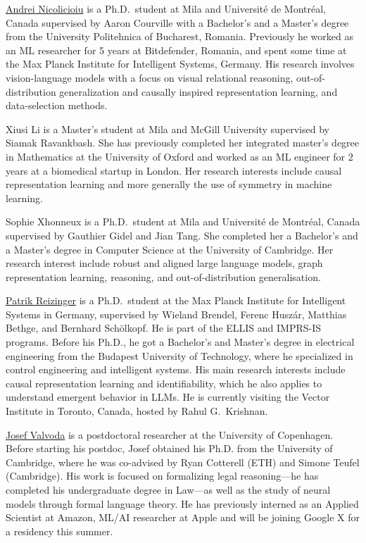 \documentclass{article}
\begin{document}
\href{https://andreinicolicioiu.github.io/}{Andrei Nicolicioiu} is a Ph.D.\ student at Mila and Universit\'{e} de Montr\'{e}al, Canada supervised by Aaron Courville with a Bachelor’s and a Master’s degree from the University Politehnica of Bucharest, Romania. Previously he worked as an ML researcher for 5 years at Bitdefender, Romania, and spent some time at the Max Planck Institute for Intelligent Systems, Germany. His research involves vision-language models with a focus on visual relational reasoning, out-of-distribution generalization and causally inspired representation learning, and data-selection methods.

Xiusi Li is a Master's student at Mila and McGill University supervised by Siamak Ravankbash. She has previously completed her integrated master's degree in Mathematics at the University of Oxford and worked as an ML engineer for 2 years at a biomedical startup in London. Her research interests include causal representation learning and more generally the use of symmetry in machine learning.

Sophie Xhonneux is a Ph.D.\ student at Mila and Universit\'{e} de Montr\'{e}al, Canada supervised by Gauthier Gidel and Jian Tang. She completed her a Bachelor's and a Master's degree in Computer Science at the University of Cambridge. Her research interest include robust and aligned large language models, graph representation learning, reasoning, and out-of-distribution generalisation.


\href{https://rpatrik96.github.io/}{Patrik Reizinger} is a Ph.D.\ student at the Max Planck Institute for Intelligent Systems in Germany, supervised by Wieland Brendel, Ferenc Huszár, Matthias Bethge, and Bernhard Schölkopf. He is part of the ELLIS and IMPRS-IS programs. Before his Ph.D., he got a Bachelor's and Master's degree in electrical engineering from the Budapest University of Technology, where he specialized in control engineering and intelligent systems. His main research interests include causal representation learning and identifiability, which he also applies to understand emergent behavior in LLMs. He is currently visiting the Vector Institute in Toronto, Canada, hosted by Rahul G.~Krishnan.

\href{https://valvoda.github.io/}{Josef Valvoda} is a postdoctoral researcher at the University of Copenhagen. 
Before starting his postdoc, Josef obtained his Ph.D. from the University of Cambridge, where he was co-advised by Ryan Cotterell (ETH) and Simone Teufel (Cambridge).
His work is focused on formalizing legal reasoning---he has completed his undergraduate degree in Law---as well as the study of neural models through formal language theory.
He has previously interned as an Applied Scientist at Amazon, ML/AI researcher at Apple and will be joining Google X for a residency this summer.
\end{document}
